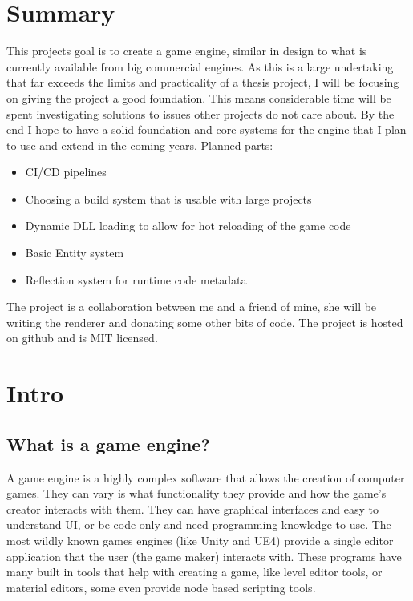 \chapter{Summary}

This projects goal is to create a game engine, similar in design to what is currently available from big commercial engines.
As this is a large undertaking that far exceeds the limits and practicality of a thesis project, I will be focusing on giving the project a good foundation. This means considerable time will be spent investigating solutions to issues other projects do not care about. By the end I hope to have a solid foundation and core systems for the engine that I plan to use and extend in the coming years.
Planned parts:

\begin{itemize}
    \item CI/CD pipelines
    \item Choosing a build system that is usable with large projects
    \item Dynamic DLL loading to allow for hot reloading of the game code
    \item Basic Entity system
    \item Reflection system for runtime code metadata
\end{itemize}

The project is a collaboration between me and a friend of mine, she will be writing the renderer and donating some other bits of code.
The project is hosted on github and is MIT licensed.


\chapter{Intro}

\section{What is a game engine?}
A game engine is a highly complex software that allows the creation of computer games. They can vary is what functionality they provide and how the game's creator interacts with them. They can have graphical interfaces and easy to understand UI, or be code only and need programming knowledge to use. The most wildly known games engines (like Unity and UE4) provide a single editor application that the user (the game maker) interacts with. These programs have many built in tools that help with creating a game, like level editor tools, or material editors, some even provide node based scripting tools.

